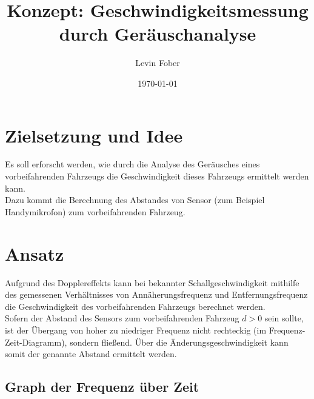 \documentclass[12pt, a4paper]{article}
\title{Konzept: Geschwindigkeitsmessung durch Geräuschanalyse}
\author{Levin Fober}
\date{\today}
\begin{document}
\maketitle

\section{Zielsetzung und Idee}
Es soll erforscht werden, wie durch die Analyse des Geräusches eines
vorbeifahrenden Fahrzeugs die Geschwindigkeit dieses Fahrzeugs ermittelt werden
kann. \\
Dazu kommt die Berechnung des Abstandes von Sensor (zum Beispiel Handymikrofon)
zum vorbeifahrenden Fahrzeug.

\section{Ansatz}
Aufgrund des Dopplereffekts kann bei bekannter Schallgeschwindigkeit mithilfe
des gemessenen Verhältnisses von Annäherungsfrequenz und Entfernungsfrequenz die
Geschwindigkeit des vorbeifahrenden Fahrzeugs berechnet werden.\\
Sofern der Abstand des Sensors zum vorbeifahrenden Fahrzeug \(d > 0\) sein
sollte, ist der Übergang von hoher zu niedriger Frequenz nicht rechteckig (im
Frequenz-Zeit-Diagramm), sondern fließend. Über die Änderungsgeschwindigkeit
kann somit der genannte Abstand ermittelt werden.

\subsection{Graph der Frequenz über Zeit}
\hskip 5pt
\end{document}
